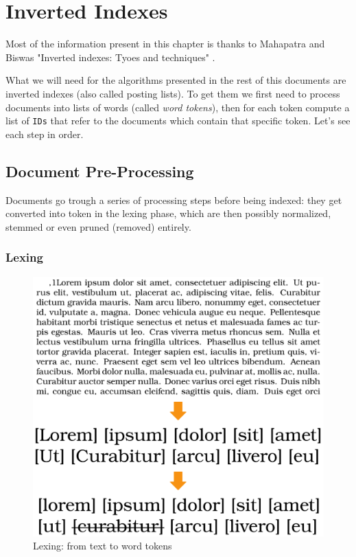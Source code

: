 \chapter{Inverted Indexes\label{invindex}}

Most of the information present in this chapter is thanks to Mahapatra and Biswas "Inverted indexes: Tyoes and techniques" \citep{fromDocToIndex}. 

What we will need for the algorithms presented in the rest of this documents are inverted indexes (also called posting lists). To get them we first need to process documents into lists of words (called \textit{word tokens}), then for each token compute a list of \verb+IDs+ that refer to the documents which contain that specific token. Let's see each step in order.

\section{Document Pre-Processing}

Documents go trough a series of processing steps before being indexed: they get converted into token in the lexing phase, which are then possibly normalized, stemmed or even pruned (removed) entirely.

\subsection{Lexing}

\begin{figure} %
    \centering
    \includegraphics[width=.5\textwidth]{imgs/lorem_lexing.png}
    \caption{Lexing: from text to word tokens\label{fig:lorem_lexing}}
\end{figure}

